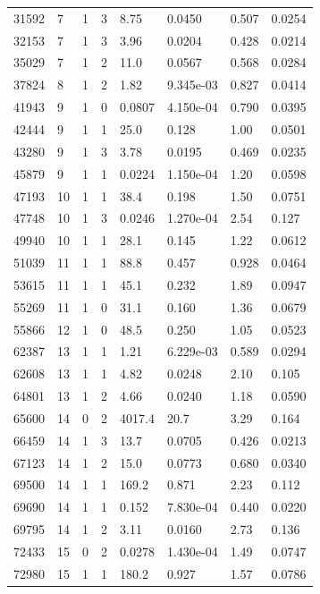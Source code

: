 \documentclass[preview]{standalone}
\begin{document}
{{\begin{tabular}{L{1.2cm}C{1.2cm} C{0.3cm}C{0.5cm} C{1.4cm}C{1.4cm} C{1.4cm}C{1.4cm}}
  31592  &     7  & 1     &  3 &  8.75  & 0.0450  & 0.507 &  0.0254   \\ 
  32153  &     7  & 1     &  3 &  3.96  & 0.0204  & 0.428 &  0.0214   \\ 
  35029  &     7  & 1     &  2 &  11.0  & 0.0567  & 0.568 &  0.0284   \\ 
  37824  &     8  & 1     &  2 &  1.82  & 9.345e-03  & 0.827 &  0.0414   \\ 
  41943  &     9  & 1     &  0 &  0.0807  & 4.150e-04  & 0.790 &  0.0395   \\ 
  42444  &     9  & 1     &  1 &  25.0  & 0.128  & 1.00 &  0.0501   \\ 
  43280  &     9  & 1     &  3 &  3.78  & 0.0195  & 0.469 &  0.0235   \\ 
  45879  &     9  & 1     &  1 &  0.0224  & 1.150e-04  & 1.20 &  0.0598   \\ 
  47193  &    10  & 1     &  1 &  38.4  & 0.198  & 1.50 &  0.0751   \\ 
  47748  &    10  & 1     &  3 &  0.0246  & 1.270e-04  & 2.54 &  0.127   \\ 
  49940  &    10  & 1     &  1 &  28.1  & 0.145  & 1.22 &  0.0612   \\ 
  51039  &    11  & 1     &  1 &  88.8  & 0.457  & 0.928 &  0.0464   \\ 
  53615  &    11  & 1     &  1 &  45.1  & 0.232  & 1.89 &  0.0947   \\ 
  55269  &    11  & 1     &  0 &  31.1  & 0.160  & 1.36 &  0.0679   \\ 
  55866  &    12  & 1     &  0 &  48.5  & 0.250  & 1.05 &  0.0523   \\ 
  62387  &    13  & 1     &  1 &  1.21  & 6.229e-03  & 0.589 &  0.0294   \\ 
  62608  &    13  & 1     &  1 &  4.82  & 0.0248  & 2.10 &  0.105   \\ 
  64801  &    13  & 1     &  2 &  4.66  & 0.0240  & 1.18 &  0.0590   \\ 
  65600  &    14  & 0     &  2 &  4017.4  & 20.7  & 3.29 &  0.164   \\ 
  66459  &    14  & 1     &  3 &  13.7  & 0.0705  & 0.426 &  0.0213   \\ 
  67123  &    14  & 1     &  2 &  15.0  & 0.0773  & 0.680 &  0.0340   \\ 
  69500  &    14  & 1     &  1 &  169.2  & 0.871  & 2.23 &  0.112   \\ 
  69690  &    14  & 1     &  1 &  0.152  & 7.830e-04  & 0.440 &  0.0220   \\ 
  69795  &    14  & 1     &  2 &  3.11  & 0.0160  & 2.73 &  0.136   \\ 
  72433  &    15  & 0     &  2 &  0.0278  & 1.430e-04  & 1.49 &  0.0747   \\ 
  72980  &    15  & 1     &  1 &  180.2  & 0.927  & 1.57 &  0.0786   \\ 
\hline 
\end{tabular} 

}}
\end{document}

